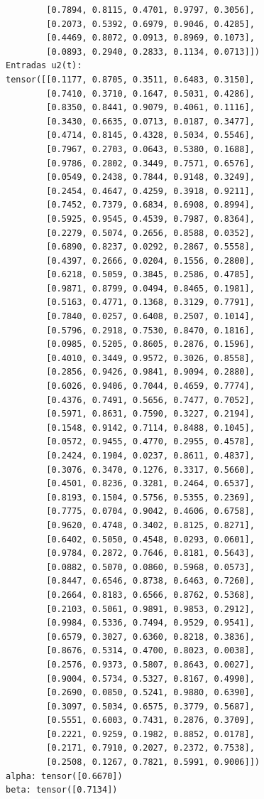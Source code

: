 \documentclass[12 pt]{article}
\begin{document}
\begin{enumerate}
\begin{lstlisting}
        [0.7894, 0.8115, 0.4701, 0.9797, 0.3056],
        [0.2073, 0.5392, 0.6979, 0.9046, 0.4285],
        [0.4469, 0.8072, 0.0913, 0.8969, 0.1073],
        [0.0893, 0.2940, 0.2833, 0.1134, 0.0713]])
Entradas u2(t): 
tensor([[0.1177, 0.8705, 0.3511, 0.6483, 0.3150],
        [0.7410, 0.3710, 0.1647, 0.5031, 0.4286],
        [0.8350, 0.8441, 0.9079, 0.4061, 0.1116],
        [0.3430, 0.6635, 0.0713, 0.0187, 0.3477],
        [0.4714, 0.8145, 0.4328, 0.5034, 0.5546],
        [0.7967, 0.2703, 0.0643, 0.5380, 0.1688],
        [0.9786, 0.2802, 0.3449, 0.7571, 0.6576],
        [0.0549, 0.2438, 0.7844, 0.9148, 0.3249],
        [0.2454, 0.4647, 0.4259, 0.3918, 0.9211],
        [0.7452, 0.7379, 0.6834, 0.6908, 0.8994],
        [0.5925, 0.9545, 0.4539, 0.7987, 0.8364],
        [0.2279, 0.5074, 0.2656, 0.8588, 0.0352],
        [0.6890, 0.8237, 0.0292, 0.2867, 0.5558],
        [0.4397, 0.2666, 0.0204, 0.1556, 0.2800],
        [0.6218, 0.5059, 0.3845, 0.2586, 0.4785],
        [0.9871, 0.8799, 0.0494, 0.8465, 0.1981],
        [0.5163, 0.4771, 0.1368, 0.3129, 0.7791],
        [0.7840, 0.0257, 0.6408, 0.2507, 0.1014],
        [0.5796, 0.2918, 0.7530, 0.8470, 0.1816],
        [0.0985, 0.5205, 0.8605, 0.2876, 0.1596],
        [0.4010, 0.3449, 0.9572, 0.3026, 0.8558],
        [0.2856, 0.9426, 0.9841, 0.9094, 0.2880],
        [0.6026, 0.9406, 0.7044, 0.4659, 0.7774],
        [0.4376, 0.7491, 0.5656, 0.7477, 0.7052],
        [0.5971, 0.8631, 0.7590, 0.3227, 0.2194],
        [0.1548, 0.9142, 0.7114, 0.8488, 0.1045],
        [0.0572, 0.9455, 0.4770, 0.2955, 0.4578],
        [0.2424, 0.1904, 0.0237, 0.8611, 0.4837],
        [0.3076, 0.3470, 0.1276, 0.3317, 0.5660],
        [0.4501, 0.8236, 0.3281, 0.2464, 0.6537],
        [0.8193, 0.1504, 0.5756, 0.5355, 0.2369],
        [0.7775, 0.0704, 0.9042, 0.4606, 0.6758],
        [0.9620, 0.4748, 0.3402, 0.8125, 0.8271],
        [0.6402, 0.5050, 0.4548, 0.0293, 0.0601],
        [0.9784, 0.2872, 0.7646, 0.8181, 0.5643],
        [0.0882, 0.5070, 0.0860, 0.5968, 0.0573],
        [0.8447, 0.6546, 0.8738, 0.6463, 0.7260],
        [0.2664, 0.8183, 0.6566, 0.8762, 0.5368],
        [0.2103, 0.5061, 0.9891, 0.9853, 0.2912],
        [0.9984, 0.5336, 0.7494, 0.9529, 0.9541],
        [0.6579, 0.3027, 0.6360, 0.8218, 0.3836],
        [0.8676, 0.5314, 0.4700, 0.8023, 0.0038],
        [0.2576, 0.9373, 0.5807, 0.8643, 0.0027],
        [0.9004, 0.5734, 0.5327, 0.8167, 0.4990],
        [0.2690, 0.0850, 0.5241, 0.9880, 0.6390],
        [0.3097, 0.5034, 0.6575, 0.3779, 0.5687],
        [0.5551, 0.6003, 0.7431, 0.2876, 0.3709],
        [0.2221, 0.9259, 0.1982, 0.8852, 0.0178],
        [0.2171, 0.7910, 0.2027, 0.2372, 0.7538],
        [0.2508, 0.1267, 0.7821, 0.5991, 0.9006]])
alpha: tensor([0.6670])
beta: tensor([0.7134])
\end{lstlisting}


\end{enumerate}
\end{document}
